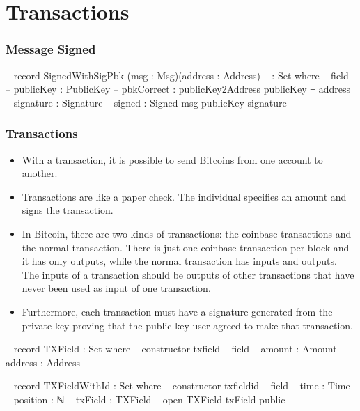 \documentclass{beamer}
\begin{document}
\section{Transactions}

\begin{frame}
  \frametitle{Message Signed}
\begin{code}
    -- record SignedWithSigPbk (msg : Msg)(address : Address)
    --   : Set where
    --   field
    --     publicKey   :  PublicKey
    --     pbkCorrect  :  publicKey2Address publicKey ≡ address
    --     signature   :  Signature
    --     signed      :  Signed msg publicKey signature

\end{code}
\end{frame}

\begin{frame}
   \frametitle{Transactions}
   \begin{itemize}[<+->]
     \item With a transaction, it is possible to send Bitcoins from one account to another.
     \item Transactions are like a paper check. The individual specifies an amount and signs the transaction.
     \item In Bitcoin, there are two kinds of transactions:
       the coinbase transactions and the normal transaction.
       There is just one coinbase transaction per block and it has only outputs,
       while the normal transaction has inputs and outputs.
       The inputs of a transaction should be outputs of other transactions that have never been used as input of one transaction.
    \item Furthermore, each transaction must have a signature generated from the private key proving that the public key user agreed to make that transaction.
   \end{itemize}
\end{frame}

\begin{frame}
\begin{code}

    -- record TXField : Set where
    --   constructor txfield
    --   field
    --     amount  : Amount
    --     address : Address

    -- record TXFieldWithId : Set where
    --   constructor txfieldid
    --   field
    --     time     : Time
    --     position : ℕ
    --     txField  : TXField
    --   open TXField txField public
\end{code}
\end{frame}
\end{document}
